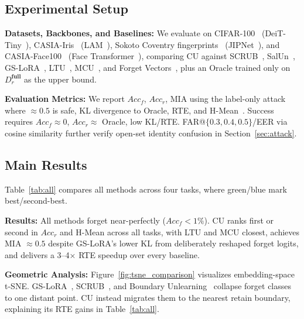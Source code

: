 \subsection{Experimental Setup}

\noindent
\textbf{Datasets, Backbones, and Baselines:} We evaluate on CIFAR-100~\cite{krizhevsky2009learning} (DeiT-Tiny~\cite{touvron2021training}), CASIA-Iris~\cite{singh2017gender} (LAM~\cite{luo2025novel}), Sokoto Coventry fingerprints~\cite{shehu2018sokoto} (JIPNet~\cite{guan2024joint}), and CASIA-Face100~\cite{yi2014learning} (Face Transformer~\cite{zhong2021face}), comparing CU against SCRUB~\cite{kurmanji2023towards}, SalUn~\cite{fan2023salun}, GS-LoRA~\cite{zhao2024continual}, LTU~\cite{huang2024learning}, MCU~\cite{shi2025mcu}, and Forget Vectors~\cite{sun2024forget}, plus an Oracle trained only on $D_r^{\textbf{full}}$ as the upper bound.

\vspace{0.02cm}
\noindent
\textbf{Evaluation Metrics:} We report $Acc_f$, $Acc_r$, MIA using the label-only attack~\cite{choquette2021label} where $\approx 0.5$ is safe, KL divergence to Oracle, RTE, and H-Mean~\cite{shibata2021learning}. Success requires $Acc_f \approx 0$, $Acc_r \approx$ Oracle, low KL/RTE. FAR@$\{0.3,0.4,0.5\}$/EER via cosine similarity further verify open-set identity confusion in Section~\ref{sec:attack}.

\subsection{Main Results}
\label{sec:main-results}
Table~\ref{tab:all} compares all methods across four tasks, where \colorbox{green!30}{green}/\colorbox{blue!30}{blue} mark best/second-best.

\vspace{0.02cm}
\noindent
\textbf{Results:} All methods forget near-perfectly ($Acc_f < 1\%$). CU ranks first or second in $Acc_r$ and H-Mean across all tasks, with LTU and MCU closest, achieves MIA $\approx 0.5$ despite GS-LoRA's lower KL from deliberately reshaped forget logits, and delivers a 3--4$\times$ RTE speedup over every baseline.

\vspace{0.02cm}
\noindent
\textbf{Geometric Analysis:}
\label{sec:tsne}
Figure~\ref{fig:tsne_comparison} visualizes embedding-space t-SNE. GS-LoRA~\cite{zhao2024continual}, SCRUB~\cite{kurmanji2023towards}, and Boundary Unlearning~\cite{chen2023boundary} collapse forget classes to one distant point. CU instead migrates them to the nearest retain boundary, explaining its RTE gains in Table~\ref{tab:all}.


